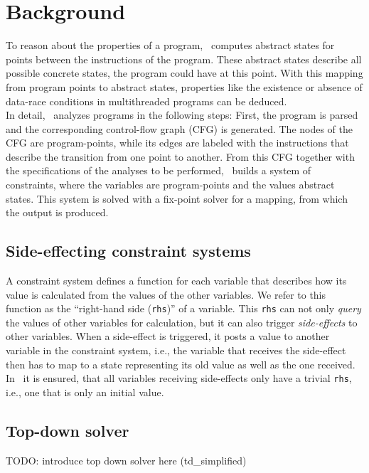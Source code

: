 \section{Background}
\label{sec:background}
To reason about the properties of a program, \gob\ computes abstract states for points between the instructions of the program. These abstract states describe all possible concrete states, the program could have at this point. With this mapping from program points to abstract states, properties like the existence or absence of data-race conditions in multithreaded programs can be deduced.\\
In detail, \gob\ analyzes programs in the following steps: First, the program is parsed and the corresponding control-flow graph (CFG) is generated. The nodes of the CFG are program-points, while its edges are labeled with the instructions that describe the transition from one point to another. From this CFG together with the specifications of the analyses to be performed, \gob\ builds a system of constraints, where the variables are program-points and the values abstract states. This system is solved with a fix-point solver for a mapping, from which the output is produced.

  \subsection{Side-effecting constraint systems}
  \label{sec:background:constrSys}
  A constraint system defines a function for each variable that describes how its value is calculated from the values of the other variables. We refer to this function as the ``right-hand side (\texttt{rhs})'' of a variable. This \texttt{rhs} can not only \textit{query} the values of other variables for calculation, but it can also trigger \textit{side-effects} to other variables. When a side-effect is triggered, it posts a value to another variable in the constraint system, i.e., the variable that receives the side-effect then has to map to a state representing its old value as well as the one received.\\
  In \gob\ it is ensured, that all variables receiving side-effects only have a trivial \texttt{rhs}, i.e., one that is only an initial value.

  \subsection{Top-down solver}
  \label{sec:background:td}
  TODO: introduce top down solver here (td\_simplified)
